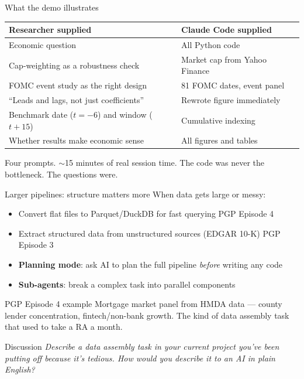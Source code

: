 \documentclass[aspectratio=169, 10pt]{beamer}
\newcommand{\discussprompt}[1]{%
  \begin{alertblock}{\faComments\quad Discussion}
    \textit{#1}
  \end{alertblock}
}
\begin{document}
\begin{frame}{What the demo illustrates}
  \begin{center}
  \begin{tabular}{p{} p{}}
    \toprule
    \textbf{Researcher supplied} & \textbf{Claude Code supplied}\\
    \midrule
    Economic question & All Python code\\
    Cap-weighting as a robustness check & Market cap from Yahoo Finance\\
    FOMC event study as the right design & 81 FOMC dates, event panel\\
    ``Leads and lags, not just coefficients'' & Rewrote figure immediately\\
    Benchmark date ($t{=}{-}6$) and window ($t{+}15$) & Cumulative indexing\\
    Whether results make economic sense & All figures and tables\\
    \bottomrule
  \end{tabular}
  \end{center}
  \vspace{0.3em}
  \begin{findingbox}
    Four prompts. $\sim$15 minutes of real session time.
    The code was never the bottleneck. The questions were.
  \end{findingbox}
\end{frame}

\begin{frame}{Larger pipelines: structure matters more}
  When data gets large or messy:
  \begin{itemize}
    \item Convert flat files to Parquet/DuckDB for fast querying \hfill{\small\color{black!50}PGP Episode 4}
    \item Extract structured data from unstructured sources (EDGAR 10-K) \hfill{\small\color{black!50}PGP Episode 3}
    \item \textbf{Planning mode}: ask AI to plan the full pipeline \textit{before} writing any code
    \item \textbf{Sub-agents}: break a complex task into parallel components
  \end{itemize}

  \vspace{0.4em}
  \begin{block}{PGP Episode 4 example}
    \small Mortgage market panel from HMDA data --- county lender
    concentration, fintech/non-bank growth. The kind of data assembly task
    that used to take a RA a month.
  \end{block}

  \discussprompt{Describe a data assembly task in your current project you've
  been putting off because it's tedious. How would you describe it to an AI
  in plain English?}
\end{frame}
\end{document}
